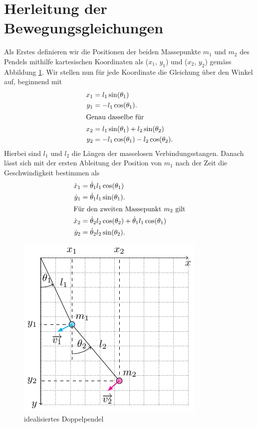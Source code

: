 
\section{Herleitung der Bewegungsgleichungen}
Als Erstes definieren wir die Positionen der beiden Massepunkte 
\(m_1\) und \(m_2\) des Pendels mithilfe kartesischen Koordinaten 
als (\(x_1\), \(y_1\)) und (\(x_2\), \(y_2\)) gemäss Abbildung \ref{fig:pendulum}.
Wir stellen nun für jede Koordinate die Gleichung über den Winkel auf,
beginnend mit
\begin{align}
    x_1 &= l_1 \sin(\theta_1)\\
    y_1 &= -l_1 \cos(\theta_1).\\
    \shortintertext{Genau dasselbe für}
    x_2 &= l_1 \sin(\theta_1) + l_2 \sin(\theta_2)\\
    y_2 &= -l_1 \cos(\theta_1) - l_2 \cos(\theta_2).  
\end{align}
Hierbei sind \(l_1\) und \(l_2\) die Längen der masselosen Verbindungsstangen.
Danach lässt sich mit der ersten Ableitung der Position von
\(m_1\) nach der Zeit die Geschwindigkeit bestimmen als
\begin{align}
    \dot{x}_1 &= \dot{\theta}_1 l_1 \cos(\theta_1)\\
    \dot{y}_1 &= \dot{\theta}_1 l_1 \sin(\theta_1).\\ 
    \shortintertext{Für den zweiten Massepunkt \(m_2\) gilt}
    \dot{x}_2 &= \dot{\theta}_2 l_2 \cos(\theta_2)
    + \dot{\theta}_1 l_1 \cos(\theta_1)\\
    \dot{y}_2 &= \dot{\theta}_2 l_2 \sin(\theta_2).
\end{align}

\begin{figure}
    \centering
    \includegraphics{papers/doppelpendel/images/pendel_pic.pdf}
    \caption{idealisiertes Doppelpendel}
    \label{fig:pendulum}
\end{figure}

